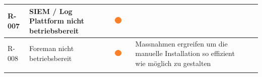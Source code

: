 \begin{table}[H]
{\begin{tabular}{lllllll}
R-007                                                                       & SIEM / Log Plattform nicht betriebsbereit                                                          & {\includegraphics[width=0.05\linewidth]{source/status_report/main/risk_warning}}                     &                         &                                                                                                                                                                &                                                                                                                                                                 &                                                                                                                                 \\ \hline
R-008                                                                       & Foreman nicht betriebsbereit                                                                       & {\includegraphics[width=0.05\linewidth]{source/status_report/main/risk_warning}}                     &                         & Massnahmen ergreifen um die manuelle Installation so effizient wie möglich zu gestalten                                                                        &                                                                                                                                                                 &                                                                                                                                 \\ \hline
                                                                            &                                                                                                    &                                                                                                      &                         &                                                                                                                                                                &                                                                                                                                                                 &                                                                                                                                 \\

\end{tabular}}
\end{table}
